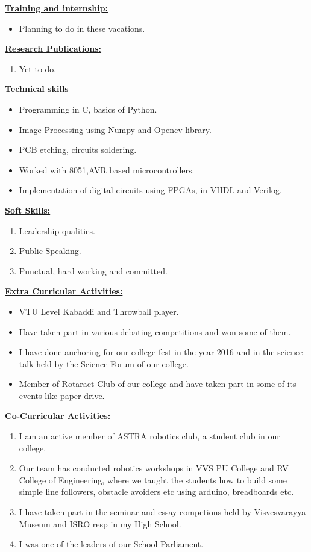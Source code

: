 \documentclass[10pt]{article}
\begin{document}
\underline{\textbf{\Large{Training and internship:}}}
\begin{itemize}
	\item{Planning to do in these vacations.}	
\end{itemize}
\hfill

\underline{\textbf{\Large{Research Publications:}}}
\begin{enumerate}
	\item{Yet to do.}	
\end{enumerate}
\hfill

\underline{\textbf{\Large{Technical skills}}}
\begin{itemize}
	\item{Programming in C, basics of Python.}
	\item{Image Processing using Numpy and Opencv library.}
	\item{PCB etching, circuits soldering.}
	\item{Worked with 8051,AVR based microcontrollers.}
	\item{Implementation of digital circuits using FPGAs, in VHDL and Verilog.}
\end{itemize}
\hfill

\underline{\textbf{\Large{Soft Skills:}}}
\begin{enumerate}
	\item{Leadership qualities.}
	\item{Public Speaking.}
	\item{Punctual, hard working and committed.}	
\end{enumerate}
\hfill

\underline{\textbf{\Large{Extra Curricular Activities:}}}
\begin{itemize}
	\item{VTU Level Kabaddi and Throwball player.}
	\item{Have taken part in various debating competitions and won some of them.}
	\item{I have done anchoring for our college fest in the year 2016 and in the science talk held by the Science Forum of our college.}
	\item{Member of Rotaract Club of our college and have taken part in some of its events like paper drive.}
\end{itemize}
\hfill

\underline{\textbf{\Large{Co-Curricular Activities:}}}
\begin{enumerate}
	\item{I am an active member of ASTRA robotics club, a student club in our college.}
	\item{Our team has conducted robotics workshops in VVS PU College and RV College of Engineering, where we taught the students how to build some simple line followers, obstacle avoiders etc using arduino, breadboards etc.}
	\item{I have taken part in the seminar and essay competions held by Visvesvarayya Museum and ISRO resp in my High School.}	
	\item{I was one of the leaders of our School Parliament.}
\end{enumerate}
\hfill
\end{document}
